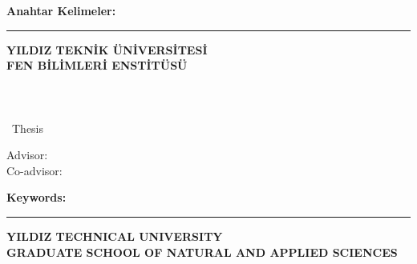 \abstractTextTurkish

{\bfseries Anahtar Kelimeler:} \abstractKeywordsTurkish

\vfill


\begin{center}
\rule{0.8\textwidth}{.1pt}

\bfseries \small
 YILDIZ TEKNİK ÜNİVERSİTESİ\\
 FEN BİLİMLERİ ENSTİTÜSÜ
\end{center}

\newpage
\chapter*{\eabstract}

\begin{center}
{\bfseries \Large\titleEN}

\student

\departmentEN \\ {\degree~Thesis}

Advisor: \advisorEN \\
Co-advisor: \coadvisorEN

\end{center}

\abstractTextEnglish

{\bfseries Keywords:} \abstractKeywordsEnglish

\vfill


\begin{center}
\rule{0.8\textwidth}{.1pt}
    
\bfseries \small
 YILDIZ TECHNICAL UNIVERSITY\\
 GRADUATE SCHOOL OF NATURAL AND APPLIED SCIENCES
\end{center}

\fi
\fi


\onehalfspacing
\clearpage
{}